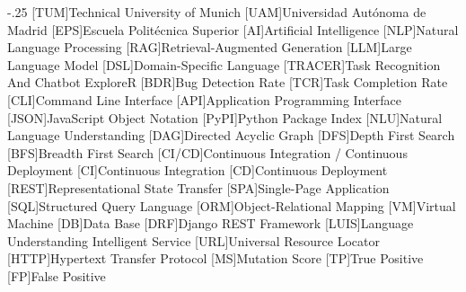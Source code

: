 \documentclass[headsepline,footsepline,footinclude=false,oneside,fontsize=11pt,paper=a4,listof=totoc,bibliography=totoc]{scrbook} %
\begin{document}

\frontmatter{}





\tableofcontents{}

\mainmatter{}









\appendix{}




\begin{acronym}
	\itemsep-.25\baselineskip
	[TUM]{Technical University of Munich}
  [UAM]{Universidad Autónoma de Madrid}
  [EPS]{Escuela Politécnica Superior}
  [AI]{Artificial Intelligence}
  [NLP]{Natural Language Processing}
  [RAG]{Retrieval-Augmented Generation}
  [LLM]{Large Language Model}
  [DSL]{Domain-Specific Language}
  [TRACER]{Task Recognition And Chatbot ExploreR}
  [BDR]{Bug Detection Rate}
  [TCR]{Task Completion Rate}
  [CLI]{Command Line Interface}
  [API]{Application Programming Interface}
  [JSON]{JavaScript Object Notation}
  [PyPI]{Python Package Index}
  [NLU]{Natural Language Understanding}
  [DAG]{Directed Acyclic Graph}
  [DFS]{Depth First Search}
  [BFS]{Breadth First Search}
  [CI/CD]{Continuous Integration / Continuous Deployment}
  [CI]{Continuous Integration}
  [CD]{Continuous Deployment}
  [REST]{Representational State Transfer}
  [SPA]{Single-Page Application}
  [SQL]{Structured Query Language}
  [ORM]{Object-Relational Mapping}
  [VM]{Virtual Machine}
  [DB]{Data Base}
  [DRF]{Django REST Framework}
  [LUIS]{Language Understanding Intelligent Service}
  [URL]{Universal Resource Locator}
  [HTTP]{Hypertext Transfer Protocol}
  [MS]{Mutation Score}
  [TP]{True Positive}
  [FP]{False Positive}
\end{acronym}

\listoffigures{}
\listoftables{}
\printbibliography{}
\end{document}
